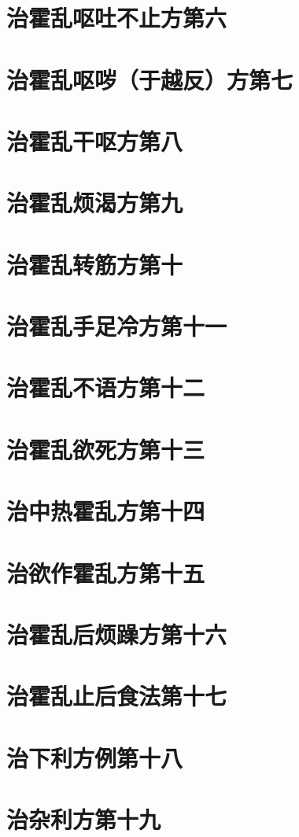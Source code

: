 \documentclass[a4paper,12pt,UTF8,twoside]{ctexbook}
\begin{document}
\chapter{治霍乱呕吐不止方第六}
\chapter{治霍乱呕哕（于越反）方第七}
\chapter{治霍乱干呕方第八}
\chapter{治霍乱烦渴方第九}
\chapter{治霍乱转筋方第十}
\chapter{治霍乱手足冷方第十一}
\chapter{治霍乱不语方第十二}
\chapter{治霍乱欲死方第十三}
\chapter{治中热霍乱方第十四}
\chapter{治欲作霍乱方第十五}
\chapter{治霍乱后烦躁方第十六}
\chapter{治霍乱止后食法第十七}
\chapter{治下利方例第十八}
\chapter{治杂利方第十九}
\end{document}
